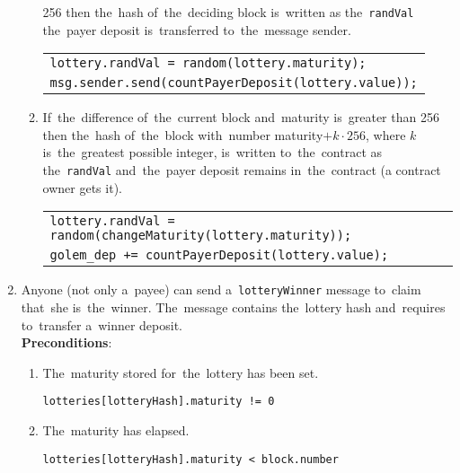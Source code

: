 \documentclass[a4paper]{article}
\begin{document}
\begin{enumerate}
\begin{enumerate}
                256 then  the~hash of~the~deciding block is~written as the~\texttt{randVal} the~payer deposit
                is~transferred to~the~message sender.
                \begin{center}
                    \begin{tabular}{l}
                        \texttt{lottery.randVal = random(lottery.maturity);}\\
                        \texttt{msg.sender.send(countPayerDeposit(lottery.value));}
                    \end{tabular}
                \end{center}
            \item If~the~difference of~the~current block and~maturity is~greater than 256 then the~hash of~the~block
            with~number maturity$+k \cdot 256$, where $k$ is~the~greatest possible integer, is~written to~the~contract
            as the~\texttt{randVal} and~the~payer deposit remains in~the~contract (a contract owner gets it).
            \begin{center}
                \begin{tabular}{l}
                    \texttt{lottery.randVal = random(changeMaturity(lottery.maturity));}\\
		            \texttt{golem\_dep += countPayerDeposit(lottery.value);}
		        \end{tabular}
		    \end{center}
        \end{enumerate}
        \item Anyone (not only a~payee) can send a~\texttt{lotteryWinner} message to~claim that~she is~the~winner.
            The~message contains the~lottery hash and~requires to~transfer a~winner deposit.\\
            \textbf{Preconditions}:
            \begin{enumerate}
                \item The~maturity stored for~the~lottery has been set.
                    \begin{center}
                        \texttt{lotteries[lotteryHash].maturity != 0}
                    \end{center}
                \item The~maturity has elapsed.
                    \begin{center}
		                \texttt{lotteries[lotteryHash].maturity < block.number}
		            \end{center}

\end{enumerate}
\end{enumerate}
\end{document}
